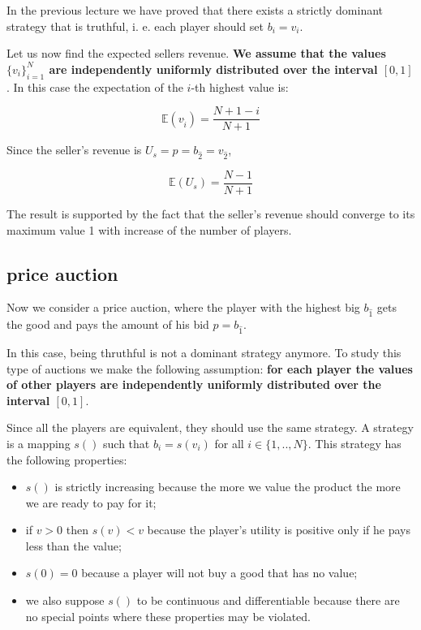 In the previous lecture we have proved that there exists a strictly dominant strategy that is truthful, i. e. each player should set $b_i = v_i$. 

Let us now find the expected sellers revenue. \textbf{We assume that the values $\{v_i\}_{i=1}^N$ are independently uniformly distributed over the interval $[0, 1]$}. In this case the expectation of the $i$-th highest value is:

\begin{equation}
\mathbb{E}(v_{\hat i}) = \frac{N+1-i}{N+1}
\end{equation}

Since the seller's revenue is $U_s = p = b_{\hat2} = v_{\hat2}$,

\begin{equation}\label{eq:sel-rev-2nd-price}
\mathbb{E}(U_s) = \frac{N-1}{N+1}
\end{equation}

The result is supported by the fact that the seller's revenue should converge to its maximum value 1 with increase of the number of players.

\subsection{ price auction}

Now we consider a  price auction, where the player with the highest big $b_{\hat1}$ gets the good and pays the amount of his bid $p = b_{\hat1}$.

In this case, being thruthful is not a dominant strategy anymore. To study this type of auctions we make the following assumption: \textbf{for each player the values of other players are independently uniformly distributed over the interval $[0, 1]$}.

Since all the players are equivalent, they should use the same strategy. A strategy is a mapping $s()$ such that $b_i = s(v_i)$ for all $i\in\{1,..,N\}$. This strategy has the following properties:

\begin{itemize}
	\item $s()$ is strictly increasing because the more we value the product the more we are ready to pay for it;
	\item if $v > 0$ then $s(v) < v$ because the player's utility is positive only if he pays less than the value;
	\item $s(0) = 0$ because a player will not buy a good that has no value;
	\item we also suppose $s()$ to be continuous and differentiable because there are no special points where these properties may be violated.
\end{itemize}

